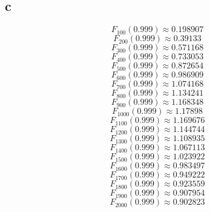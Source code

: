 \documentclass{article}
\begin{document}
\subsection*{c}

\begin{equation*}
    F_{100}(0.999) \approx 0.198907
\end{equation*}
\begin{equation*}
    F_{200}(0.999) \approx 0.39133
\end{equation*}
\begin{equation*}
    F_{300}(0.999) \approx 0.571168
\end{equation*}
\begin{equation*}
    F_{400}(0.999) \approx 0.733053
\end{equation*}
\begin{equation*}
    F_{500}(0.999) \approx 0.872654
\end{equation*}
\begin{equation*}
    F_{600}(0.999) \approx 0.986909
\end{equation*}
\begin{equation*}
    F_{700}(0.999) \approx 1.074168
\end{equation*}
\begin{equation*}
    F_{800}(0.999) \approx 1.134241
\end{equation*}
\begin{equation*}
    F_{900}(0.999) \approx 1.168348
\end{equation*}
\begin{equation*}
    F_{1000}(0.999) \approx 1.17898
\end{equation*}
\begin{equation*}
    F_{1100}(0.999) \approx 1.169676
\end{equation*}
\begin{equation*}
    F_{1200}(0.999) \approx 1.144744
\end{equation*}
\begin{equation*}
    F_{1300}(0.999) \approx 1.108935
\end{equation*}
\begin{equation*}
    F_{1400}(0.999) \approx 1.067113
\end{equation*}
\begin{equation*}
    F_{1500}(0.999) \approx 1.023922
\end{equation*}
\begin{equation*}
    F_{1600}(0.999) \approx 0.983497
\end{equation*}
\begin{equation*}
    F_{1700}(0.999) \approx 0.949222
\end{equation*}
\begin{equation*}
    F_{1800}(0.999) \approx 0.923559
\end{equation*}
\begin{equation*}
    F_{1900}(0.999) \approx 0.907954
\end{equation*}
\begin{equation*}
    F_{2000}(0.999) \approx 0.902823
\end{equation*}
\end{document}
